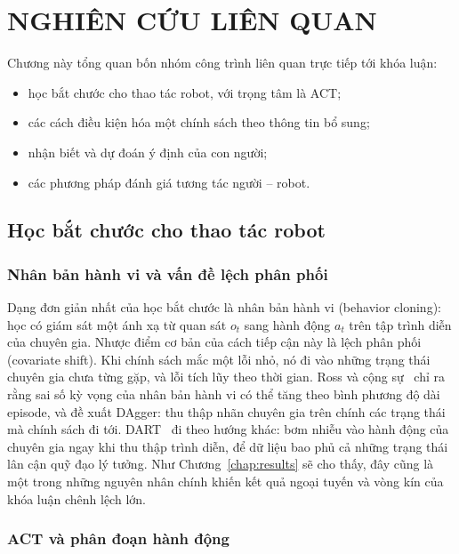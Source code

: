 \chapter{NGHIÊN CỨU LIÊN QUAN}
\label{chap:related}

Chương này tổng quan bốn nhóm công trình liên quan trực tiếp tới khóa luận:
\begin{itemize}
  \item học bắt chước cho thao tác robot, với trọng tâm là ACT;
  \item các cách điều kiện hóa một chính sách theo thông tin bổ sung;
  \item nhận biết và dự đoán ý định của con người;
  \item các phương pháp đánh giá tương tác người -- robot.
\end{itemize}

\section{Học bắt chước cho thao tác robot}
\label{sec:related-il}

\subsection{Nhân bản hành vi và vấn đề lệch phân phối}

Dạng đơn giản nhất của học bắt chước là nhân bản hành vi (behavior cloning): học có giám sát một ánh xạ từ quan sát $o_t$ sang hành động $a_t$ trên tập trình diễn của chuyên gia. Nhược điểm cơ bản của cách tiếp cận này là lệch phân phối (covariate shift). Khi chính sách mắc một lỗi nhỏ, nó đi vào những trạng thái chuyên gia chưa từng gặp, và lỗi tích lũy theo thời gian. Ross và cộng sự~\cite{ross2011dagger} chỉ ra rằng sai số kỳ vọng của nhân bản hành vi có thể tăng theo bình phương độ dài episode, và đề xuất DAgger: thu thập nhãn chuyên gia trên chính các trạng thái mà chính sách đi tới. DART~\cite{laskey2017dart} đi theo hướng khác: bơm nhiễu vào hành động của chuyên gia ngay khi thu thập trình diễn, để dữ liệu bao phủ cả những trạng thái lân cận quỹ đạo lý tưởng. Như Chương~\ref{chap:results} sẽ cho thấy, đây cũng là một trong những nguyên nhân chính khiến kết quả ngoại tuyến và vòng kín của khóa luận chênh lệch lớn.

\subsection{ACT và phân đoạn hành động}

